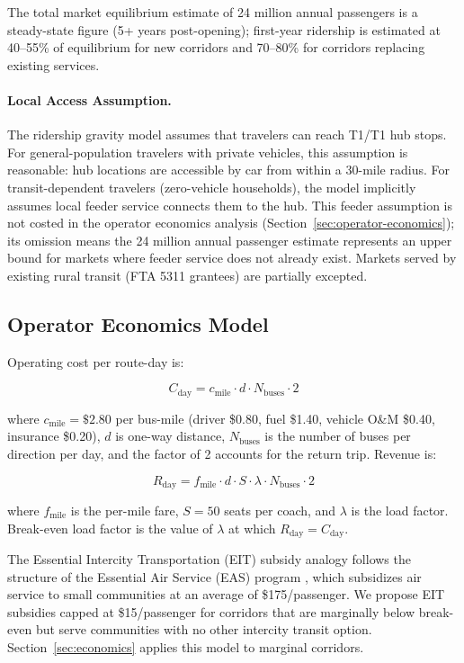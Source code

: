 The total market equilibrium estimate of 24 million annual passengers is a steady-state figure (5+ years post-opening); first-year ridership is estimated at 40--55\% of equilibrium for new corridors and 70--80\% for corridors replacing existing services.

\paragraph{Local Access Assumption.}
The ridership gravity model assumes that travelers can reach T1/T1 hub stops. For
general-population travelers with private vehicles, this assumption is reasonable: hub
locations are accessible by car from within a 30-mile radius. For transit-dependent travelers
(zero-vehicle households), the model implicitly assumes local feeder service connects them
to the hub. This feeder assumption is not costed in the operator economics analysis
(Section~\ref{sec:operator-economics}); its omission means the 24 million annual passenger
estimate represents an upper bound for markets where feeder service does not already exist.
Markets served by existing rural transit (FTA 5311 grantees) are partially excepted.

\subsection{Operator Economics Model}

Operating cost per route-day is:

\begin{equation}
  C_{\text{day}} = c_{\text{mile}} \cdot d \cdot N_{\text{buses}} \cdot 2
  \label{eq:cost}
\end{equation}

where $c_{\text{mile}} = \$2.80$ per bus-mile (driver \$0.80, fuel \$1.40, vehicle O\&M \$0.40, insurance \$0.20), $d$ is one-way distance, $N_{\text{buses}}$ is the number of buses per direction per day, and the factor of 2 accounts for the return trip. Revenue is:

\begin{equation}
  R_{\text{day}} = f_{\text{mile}} \cdot d \cdot S \cdot \lambda \cdot N_{\text{buses}} \cdot 2
  \label{eq:revenue}
\end{equation}

where $f_{\text{mile}}$ is the per-mile fare, $S = 50$ seats per coach, and $\lambda$ is the load factor. Break-even load factor is the value of $\lambda$ at which $R_{\text{day}} = C_{\text{day}}$.

The Essential Intercity Transportation (EIT) subsidy analogy follows the structure of the Essential Air Service (EAS) program \citep{EAS_DOT2023}, which subsidizes air service to small communities at an average of \$175/passenger. We propose EIT subsidies capped at \$15/passenger for corridors that are marginally below break-even but serve communities with no other intercity transit option. Section~\ref{sec:economics} applies this model to marginal corridors.
